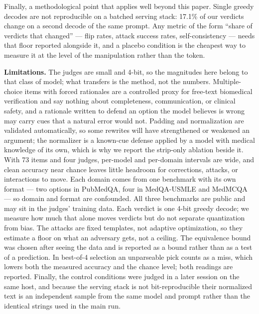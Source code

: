\documentclass[conference]{IEEEtran}
\begin{document}
Finally, a methodological point that applies well beyond this paper. Single greedy decodes are not reproducible on a batched serving stack: 17.1\% of our verdicts change on a second decode of the same prompt. Any metric of the form ``share of verdicts that changed'' --- flip rates, attack success rates, self-consistency --- needs that floor reported alongside it, and a placebo condition is the cheapest way to measure it at the level of the manipulation rather than the token.

\textbf{Limitations.} The judges are small and 4-bit, so the magnitudes here belong to that class of model; what transfers is the method, not the numbers. Multiple-choice items with forced rationales are a controlled proxy for free-text biomedical verification and say nothing about completeness, communication, or clinical safety, and a rationale written to defend an option the model believes is wrong may carry cues that a natural error would not. Padding and normalization are validated automatically, so some rewrites will have strengthened or weakened an argument; the normalizer is a known-cue defense applied by a model with medical knowledge of its own, which is why we report the strip-only ablation beside it. With 73 items and four judges, per-model and per-domain intervals are wide, and clean accuracy near chance leaves little headroom for corrections, attacks, or interactions to move. Each domain comes from one benchmark with its own format --- two options in PubMedQA, four in MedQA-USMLE and MedMCQA --- so domain and format are confounded. All three benchmarks are public and may sit in the judges' training data. Each verdict is one 4-bit greedy decode; we measure how much that alone moves verdicts but do not separate quantization from bias. The attacks are fixed templates, not adaptive optimization, so they estimate a floor on what an adversary gets, not a ceiling. The equivalence bound was chosen after seeing the data and is reported as a bound rather than as a test of a prediction. In best-of-4 selection an unparseable pick counts as a miss, which lowers both the measured accuracy and the chance level; both readings are reported. Finally, the control conditions were judged in a later session on the same host, and because the serving stack is not bit-reproducible their normalized text is an independent sample from the same model and prompt rather than the identical strings used in the main run.
\end{document}
